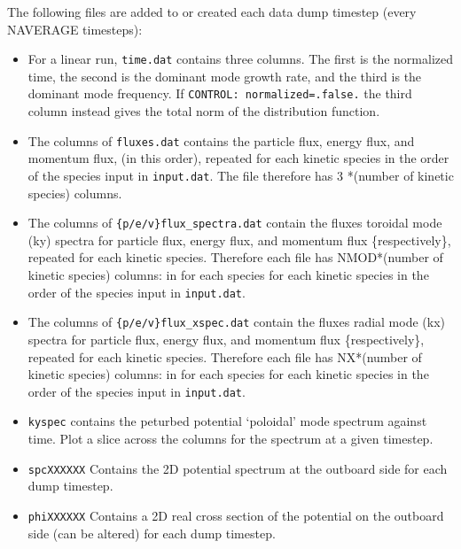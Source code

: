 \documentclass{report}
\begin{document}
\vspace{10pt}
\noindent
The following files are added to or created each data dump timestep (every NAVERAGE timesteps):
\begin{itemize}
\item For a linear run, \texttt{time.dat} contains three columns.  The first is the normalized time, the second is the dominant mode growth rate, and the third is the dominant mode frequency.  If \texttt{CONTROL: normalized=.false.} the third column instead gives the total norm of the distribution function.

\item The columns of \texttt{fluxes.dat} contains the particle flux, energy flux, and momentum flux, (in this order), repeated for each kinetic species in the order of the species input in \texttt{input.dat}.  The file therefore has 3 *(number of kinetic species) columns.

\item The columns of \texttt{\{p/e/v\}flux\_spectra.dat} contain the fluxes toroidal mode (ky) spectra for particle flux, energy flux, and momentum flux \{respectively\}, repeated for each kinetic species.  Therefore each file has NMOD*(number of kinetic species) columns: in for each species for each kinetic species in the order of the species input in \texttt{input.dat}.

\item The columns of \texttt{\{p/e/v\}flux\_xspec.dat} contain the fluxes radial mode (kx) spectra for particle flux, energy flux, and momentum flux \{respectively\}, repeated for each kinetic species.  Therefore each file has NX*(number of kinetic species) columns: in for each species for each kinetic species in the order of the species input in \texttt{input.dat}.

\item \texttt{kyspec} contains the peturbed potential `poloidal' mode spectrum against time.  Plot a slice across the columns for the spectrum at a given timestep.

\item \texttt{spcXXXXXX} Contains the 2D potential spectrum at the outboard side for each dump timestep.

\item \texttt{phiXXXXXX} Contains a 2D real cross section of the potential on the outboard side (can be altered) for each dump timestep.
\end {itemize}
\end{document}
